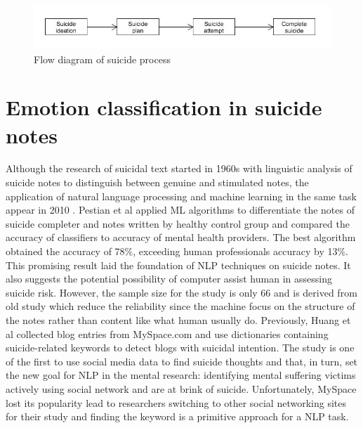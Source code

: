 \begin{figure}[!ht]
\centering
\includegraphics[width=\textwidth, clip=true]{img/suicide_process}
\caption[Process of suicide]{Flow diagram of suicide process} 
\label{fig:suicide_process}
\end{figure}

\section{Emotion classification in suicide notes}
Although the research of suicidal text started in 1960s with linguistic analysis of suicide notes to distinguish between genuine and stimulated notes, the application of natural language processing  and machine learning in the same task appear in 2010 \cite{Desmet2013}. Pestian et al \cite{Pestian2010} applied ML algorithms to differentiate the notes of suicide completer and notes written by healthy control group and compared the accuracy of classifiers to accuracy of mental health providers. The best algorithm obtained the accuracy of 78\%, exceeding human professionals accuracy by 13\%. This promising result laid the foundation of NLP techniques on suicide notes. It also suggests the potential possibility of computer assist human in assessing suicide risk. However, the sample size for the study is only 66 and is derived from old study which reduce the reliability since the machine focus on the structure of the notes rather than content like what human usually do. Previously, Huang et al \cite{Huang2008} collected blog entries from MySpace.com and use dictionaries containing suicide-related keywords to detect blogs with suicidal intention. The study is one of the first to use social media data to find suicide thoughts and that, in turn, set the new goal for NLP in the mental research: identifying mental suffering victims actively using social network and are at brink of suicide. Unfortunately, MySpace lost its popularity lead to researchers switching to other social networking sites for their study and finding the keyword is a primitive approach for a NLP task.\\

